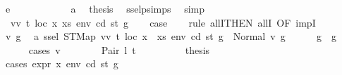 \begin{isabellebody}
\ {\isacharparenleft}{\kern0pt}e\ {\isacharunderscore}{\kern0pt}{\isacharparenright}{\kern0pt}\isanewline
\ \ \ \ \ \ \ \ \isamarkupfalse%
\ {}\ a{}\ \isamarkupfalse%
\ {\isacharquery}{\kern0pt}thesis\ \isamarkupfalse%
\ ssel{\isachardot}{\kern0pt}psimps{\isacharparenleft}{\kern0pt}{}{\isacharparenright}{\kern0pt}\ \isamarkupfalse%
\ simp\isanewline
\ \ \ \ \ \ \isamarkupfalse%
\isanewline
\ \ \ \ \isamarkupfalse%
\isanewline
\ \ \isamarkupfalse%
\isanewline
{}\isamarkupfalse%
\isanewline
\ \ \isamarkupfalse%
\ {\isacharparenleft}{\kern0pt}{}\ vv\ t\ loc\ x\ xs\ env\ cd\ st\ g{\isacharparenright}{\kern0pt}\isanewline
\ \ \isamarkupfalse%
\ {\isacharquery}{\kern0pt}case\isanewline
\ \ \isamarkupfalse%
\ {\isacharparenleft}{\kern0pt}rule\ allI{\isacharbrackleft}{\kern0pt}THEN\ allI{\isacharcomma}{\kern0pt}\ OF\ impI{\isacharbrackright}{\kern0pt}{\isacharparenright}{\kern0pt}\isanewline
\ \ \ \ \isamarkupfalse%
\ v{}{\isacharprime}{\kern0pt}\ g{}{\isacharprime}{\kern0pt}\ \isamarkupfalse%
\ a{}{\isacharcolon}{\kern0pt}\ {\isachardoublequoteopen}ssel\ {\isacharparenleft}{\kern0pt}STMap\ vv\ t{\isacharparenright}{\kern0pt}\ loc\ {\isacharparenleft}{\kern0pt}x\ {\isacharhash}{\kern0pt}\ xs{\isacharparenright}{\kern0pt}\ env\ cd\ st\ g\ {\isacharequal}{\kern0pt}\ Normal\ {\isacharparenleft}{\kern0pt}v{}{\isacharprime}{\kern0pt}{\isacharcomma}{\kern0pt}\ g{}{\isacharprime}{\kern0pt}{\isacharparenright}{\kern0pt}{\isachardoublequoteclose}\isanewline
\ \ \ \ \isamarkupfalse%
\ {\isachardoublequoteopen}g{}{\isacharprime}{\kern0pt}\ {\isasymle}\ g{\isachardoublequoteclose}\isanewline
\ \ \ \ \isamarkupfalse%
\ {\isacharparenleft}{\kern0pt}cases\ v{}{\isacharprime}{\kern0pt}{\isacharparenright}{\kern0pt}\isanewline
\ \ \ \ \ \ \isamarkupfalse%
\ {\isacharparenleft}{\kern0pt}Pair\ l{}{\isacharprime}{\kern0pt}\ t{}{\isacharprime}{\kern0pt}{\isacharparenright}{\kern0pt}\isanewline
\ \ \ \ \ \ \isamarkupfalse%
\ \isamarkupfalse%
\ {\isacharquery}{\kern0pt}thesis\isanewline
\ \ \ \ \ \ \isamarkupfalse%
\ {\isacharparenleft}{\kern0pt}cases\ {\isachardoublequoteopen}expr\ x\ env\ cd\ st\ g{\isachardoublequoteclose}{\isacharparenright}{\kern0pt}\isanewline

\end{isabellebody}

